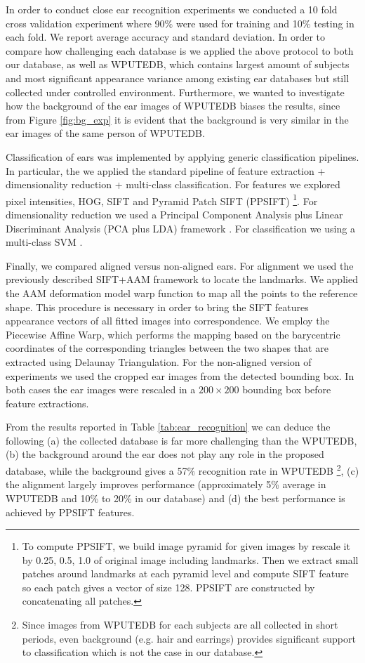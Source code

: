 In order to conduct close ear recognition experiments we conducted a 10 fold cross validation experiment where 90$\%$ were used for training  and 10$\%$ testing in each fold. We report average accuracy and standard deviation. In order to compare how challenging each database is we applied the above protocol to both our database, as well as WPUTEDB, which contains largest amount of subjects and most significant appearance variance among existing ear databases but still collected under controlled environment. Furthermore, we wanted to investigate how the background of the ear images of WPUTEDB biases the results, since from Figure \ref{fig:bg_exp} it is evident that the background is very similar in the ear images of the same person of WPUTEDB.

Classification of ears was implemented by applying generic classification pipelines. In particular, the we applied the standard pipeline of feature extraction + dimensionality reduction + multi-class classification. For features we explored pixel intensities, HOG, SIFT and Pyramid Patch SIFT (PPSIFT) \footnote{To compute PPSIFT, we build image pyramid for given images by rescale it by 0.25, 0.5, 1.0 of original image including landmarks. Then we extract small patches around landmarks at each pyramid level and compute SIFT feature so each patch gives a vector of size 128. PPSIFT are constructed by concatenating all patches.}. For dimensionality reduction we used a Principal Component Analysis plus Linear Discriminant Analysis (PCA plus LDA) framework \cite{belhumeur1997eigenfaces}. For classification we using a multi-class SVM \cite{hsu2002comparison}.


Finally, we compared aligned versus non-aligned ears. For alignment we used the previously described SIFT+AAM framework to locate the landmarks. We applied the AAM deformation model warp function to map all the points to the reference shape. This procedure is necessary in order to bring the SIFT features appearance vectors of all fitted images into correspondence. We employ the Piecewise Affine Warp, which performs the mapping based on the barycentric coordinates of the corresponding triangles between the two shapes that are extracted using Delaunay Triangulation. For the non-aligned version of experiments we used the cropped ear images from the detected bounding box. In both cases the ear images were rescaled in a $200 \times 200$ bounding box before feature extractions. 

From the results reported in Table \ref{tab:ear_recognition} we can deduce the following (a) the collected database is far more challenging than the WPUTEDB, (b) the background around the ear does not play any role in the proposed database, while the background gives a 57$\%$ recognition rate in WPUTEDB \footnote{Since images from WPUTEDB for each subjects are all collected in short periods, even background (e.g. hair and earrings) provides significant support to classification which is not the case in our database.}, (c) the alignment largely improves performance (approximately 5\% average in WPUTEDB and 10\% to 20\% in our database) and (d) the best performance is achieved by PPSIFT features. 

